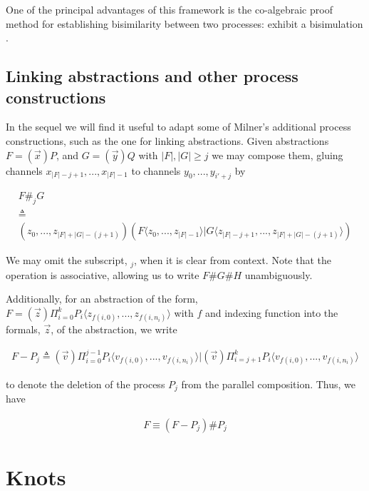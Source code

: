 \documentclass[]{llncs}
\begin{document}
One of the principal advantages of this framework is the co-algebraic
proof method for establishing bisimilarity between two processes:
exhibit a bisimulation \cite{DBLP:conf/lics/Sangiorgi04}.

\subsection{Linking abstractions and other process constructions} \label{linkingabs}

In the sequel we will find it useful to adapt some of Milner's
additional process constructions, such as the one for linking
abstractions. Given abstractions $F = (\vec{x})P$, and $G =
(\vec{y})Q$ with $|F|, |G| \geq j$ we may compose them, gluing
channels $x_{|F|-{j+1}},...,x_{|F|-1}$ to channels
$y_{0},...,y_{i'+j}$ by

\begin{eqnarray}
  & F \#_j G & \nonumber \\
  & \triangleq & \nonumber \\
  & (z_0,...,z_{|F|+|G|-(j+1)})(F\langle z_0,...,z_{|F|-1} \rangle | G\langle z_{|F|-{j+1}},..., z_{|F|+|G|-(j+1)}\rangle) &
\end{eqnarray}

We may omit the subscript, $_j$, when it is clear from context. Note
that the operation is associative, allowing us to write $F\#G\#H$
unambiguously.

Additionally, for an abstraction of the form, $F =
(\vec{z})\Pi_{i=0}^kP_i\langle z_{f(i,0)},...,z_{f(i,n_i)} \rangle$ with
$f$ and indexing function into the formals, $\vec{z}$, of the
abstraction, we write

\begin{eqnarray}
  F - P_j \triangleq (\vec{v})\Pi_{i=0}^{j-1}P_i\langle v_{f(i,0)},...,v_{f(i,n_i)}\rangle|(\vec{v})\Pi_{i=j+1}^{k}P_i\langle v_{f(i,0)},...,v_{f(i,n_i)} \rangle
\end{eqnarray}

to denote the deletion of the process $P_j$ from the parallel
composition. Thus, we have

\begin{eqnarray} \label{linkingident}
  F \equiv (F - P_j)\#P_j
\end{eqnarray}

\section{Knots}
\end{document}
